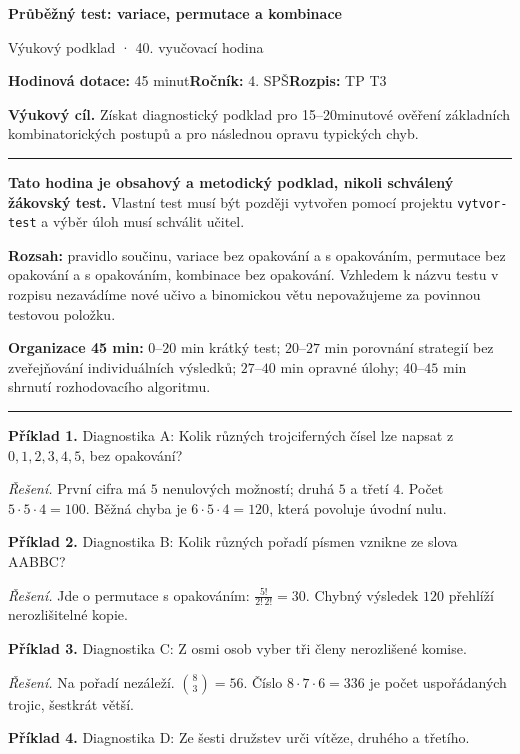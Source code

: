 \documentclass[11pt,a4paper]{article}
\newcommand{\sect}[1]{\par\vspace{2mm}{\Large\sffamily\bfseries\color{deep} #1}\par\vspace{-0.5mm}\noindent\color{teal}\rule{\linewidth}{0.7pt}\color{black}\vspace{1mm}}
\begin{document}
{\Huge\sffamily\bfseries\color{deep} Průběžný test: variace, permutace a kombinace}\par
{\sffamily\large\color{teal} Výukový podklad · 40. vyučovací hodina}\par
\textbf{Hodinová dotace:} 45 minut\quad \textbf{Ročník:} 4. SPŠ\quad \textbf{Rozpis:} TP T3\par
\begin{tcolorbox}[theobox]\textbf{Výukový cíl.} Získat diagnostický podklad pro 15–20minutové ověření základních kombinatorických postupů a pro následnou opravu typických chyb.\end{tcolorbox}
\sect{Teorie a vysvětlení}
\textbf{Tato hodina je obsahový a metodický podklad, nikoli schválený žákovský test.} Vlastní test musí být později vytvořen pomocí projektu \texttt{vytvor-test} a výběr úloh musí schválit učitel.\par
\textbf{Rozsah:} pravidlo součinu, variace bez opakování a s opakováním, permutace bez opakování a s opakováním, kombinace bez opakování. Vzhledem k názvu testu v rozpisu nezavádíme nové učivo a binomickou větu nepovažujeme za povinnou testovou položku.\par
\textbf{Organizace 45 min:} \(0\)--\(20\) min krátký test; \(20\)--\(27\) min porovnání strategií bez zveřejňování individuálních výsledků; \(27\)--\(40\) min opravné úlohy; \(40\)--\(45\) min shrnutí rozhodovacího algoritmu.
\sect{Řešené příklady}
\textbf{Příklad 1.} Diagnostika A: Kolik různých trojciferných čísel lze napsat z \(0,1,2,3,4,5\), bez opakování?\par
\textit{Řešení.} První cifra má \(5\) nenulových možností; druhá \(5\) a třetí \(4\). Počet \(5\cdot5\cdot4=100\). Běžná chyba je \(6\cdot5\cdot4=120\), která povoluje úvodní nulu.\par\smallskip
\textbf{Příklad 2.} Diagnostika B: Kolik různých pořadí písmen vznikne ze slova \textsc{AABBC}?\par
\textit{Řešení.} Jde o permutace s opakováním: \(\frac{5!}{2!\,2!}=30\). Chybný výsledek \(120\) přehlíží nerozlišitelné kopie.\par\smallskip
\textbf{Příklad 3.} Diagnostika C: Z osmi osob vyber tři členy nerozlišené komise.\par
\textit{Řešení.} Na pořadí nezáleží. \(\binom83=56\). Číslo \(8\cdot7\cdot6=336\) je počet uspořádaných trojic, šestkrát větší.\par\smallskip
\textbf{Příklad 4.} Diagnostika D: Ze šesti družstev urči vítěze, druhého a třetího.\par
\end{document}

